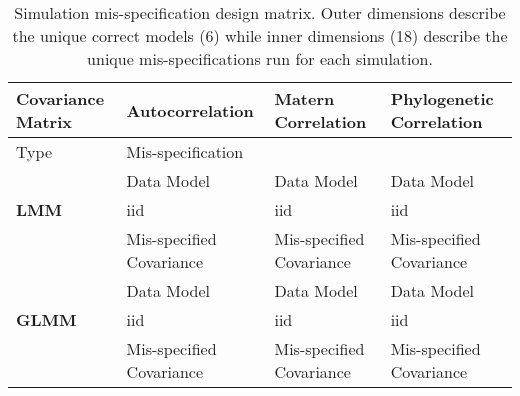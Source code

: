 \begin{table}[ht]
    \caption{Simulation mis-specification design matrix. Outer dimensions describe the unique correct models (6) while inner dimensions (18) describe the unique mis-specifications run for each simulation.}
    \begin{tabular}{l|llp{8cm}}
    \toprule
    Covariance Matrix & \textbf{Autocorrelation} & \textbf{Matern Correlation} & \textbf{Phylogenetic Correlation} \\
    \hline
     Type &\multicolumn{3}{l}{Mis-specification}\\
     \hline
     & Data Model & Data Model & Data Model \\
     \textbf{LMM}& iid & iid & iid \\
     & Mis-specified Covariance & Mis-specified Covariance & Mis-specified Covariance \\
     \hline
     & Data Model & Data Model & Data Model \\
     \textbf{GLMM}& iid & iid & iid \\
     & Mis-specified Covariance & Mis-specified Covariance & Mis-specified Covariance \\
    \bottomrule
    \end{tabular}
  \end{table}

